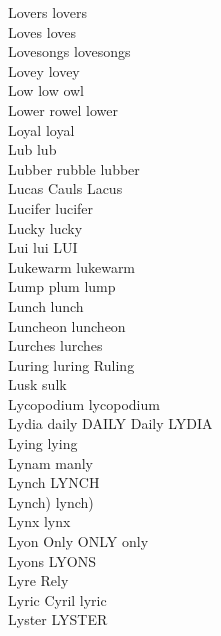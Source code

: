 Lovers lovers\\
Loves loves\\
Lovesongs lovesongs\\
Lovey lovey\\
Low low owl\\
Lower rowel lower\\
Loyal loyal\\
Lub lub\\
Lubber rubble lubber\\
Lucas Cauls Lacus\\
Lucifer lucifer\\
Lucky lucky\\
Lui lui LUI\\
Lukewarm lukewarm\\
Lump plum lump\\
Lunch lunch\\
Luncheon luncheon\\
Lurches lurches\\
Luring luring Ruling\\
Lusk sulk\\
Lycopodium lycopodium\\
Lydia daily DAILY Daily LYDIA\\
Lying lying\\
Lynam manly\\
Lynch LYNCH\\
Lynch) lynch)\\
Lynx lynx\\
Lyon Only ONLY only\\
Lyons LYONS\\
Lyre Rely\\
Lyric Cyril lyric\\
Lyster LYSTER\\

